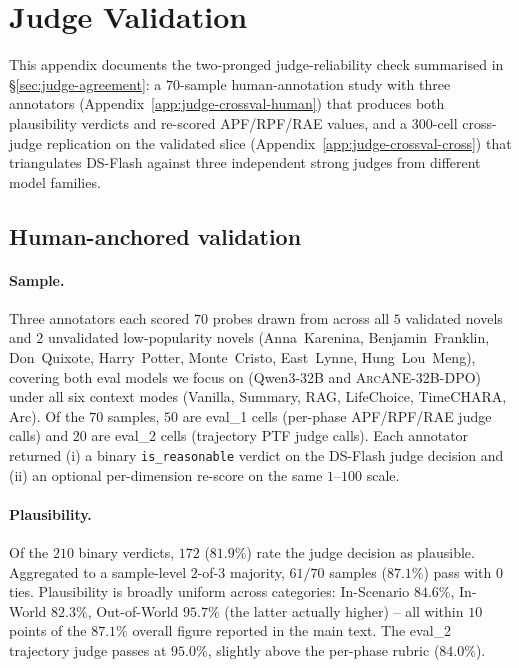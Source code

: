 \documentclass{llmxive}
\providecommand{\ours}{\textsc{ArcANE}}
\begin{document}
\section{Judge Validation\label{app:judge-crossval}}

This appendix documents the two-pronged judge-reliability check summarised in \S\ref{sec:judge-agreement}: a $70$-sample human-annotation study with three annotators (Appendix~\ref{app:judge-crossval-human}) that produces both plausibility verdicts and re-scored APF/RPF/RAE values, and a $300$-cell cross-judge replication on the validated slice (Appendix~\ref{app:judge-crossval-cross}) that triangulates DS-Flash against three independent strong judges from different model families.

\subsection{Human-anchored validation\label{app:judge-crossval-human}}

\paragraph{Sample.} Three annotators each scored $70$ probes drawn from across all $5$ validated novels and $2$ unvalidated low-popularity novels (Anna~Karenina, Benjamin~Franklin, Don~Quixote, Harry~Potter, Monte~Cristo, East~Lynne, Hung~Lou~Meng), covering both eval models we focus on (Qwen3-32B and \ours{}-32B-DPO) under all six context modes (Vanilla, Summary, RAG, LifeChoice, TimeCHARA, Arc). Of the $70$ samples, $50$ are eval\_1 cells (per-phase APF/RPF/RAE judge calls) and $20$ are eval\_2 cells (trajectory PTF judge calls). Each annotator returned (i) a binary \texttt{is\_reasonable} verdict on the DS-Flash judge decision and (ii) an optional per-dimension re-score on the same $1$--$100$ scale.

\paragraph{Plausibility.} Of the $210$ binary verdicts, $172$ ($81.9\%$) rate the judge decision as plausible. Aggregated to a sample-level $2$-of-$3$ majority, $61 / 70$ samples ($87.1\%$) pass with $0$ ties. Plausibility is broadly uniform across categories: In-Scenario $84.6\%$, In-World $82.3\%$, Out-of-World $95.7\%$ (the latter actually higher) -- all within $10$ points of the $87.1\%$ overall figure reported in the main text. The eval\_2 trajectory judge passes at $95.0\%$, slightly above the per-phase rubric ($84.0\%$).
\end{document}
